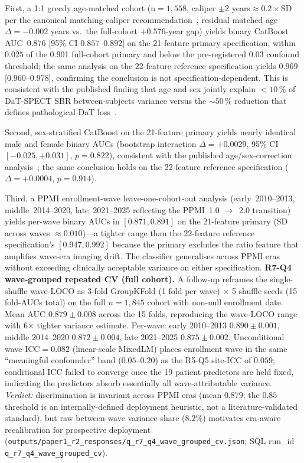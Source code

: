 \documentclass[10pt,letterpaper]{article}
\begin{document}
First, a 1:1 greedy age-matched cohort (n${=}1{,}558$, caliper $\pm 2$ years${\approx}0.2{\times}\mathrm{SD}$ per the canonical matching-caliper recommendation~\cite{austin2011caliper}, residual matched age~$\Delta{=}{-}0.002$ years vs.\ the full-cohort $+0.576$-year gap) yields binary CatBoost AUC~$0.876$ [95\% CI $0.857$--$0.892$] on the 21-feature primary specification, within $0.025$ of the 0.901 full-cohort primary and below the pre-registered $0.03$ confound threshold; the same analysis on the 22-feature reference specification yields $0.969$ [$0.960$--$0.978$], confirming the conclusion is not specification-dependent. This is consistent with the published finding that age and sex jointly explain $<\!10\,\%$ of DaT-SPECT SBR between-subjects variance versus the ${\sim}50\,\%$ reduction that defines pathological DaT loss~\cite{schmitzSteinkruger2021age,eusebi2017dat,varrone2013ageadjusted}.

Second, sex-stratified CatBoost on the 21-feature primary yields nearly identical male and female binary AUCs (bootstrap interaction $\Delta{=}{+}0.0029$, 95\% CI~$[-0.025, +0.031]$, $p{=}0.822$), consistent with the published age/sex-correction analysis~\cite{schmitzSteinkruger2021age}; the same conclusion holds on the 22-feature reference specification ($\Delta{=}{+}0.0004$, $p{=}0.914$).

Third, a PPMI enrollment-wave leave-one-cohort-out analysis (early~2010--2013, middle~2014--2020, late~2021--2025 reflecting the PPMI~1.0 $\rightarrow$~2.0 transition) yields per-wave binary AUCs in $[0.871, 0.891]$ on the 21-feature primary (SD across waves $\approx 0.010$)---a tighter range than the 22-feature reference specification's $[0.947, 0.992]$ because the primary excludes the ratio feature that amplifies wave-era imaging drift. The classifier generalises across PPMI eras without exceeding clinically acceptable variance on either specification. \textbf{R7-Q4 wave-grouped repeated CV (full cohort).} A follow-up reframes the single-shuffle wave-LOCO as 3-fold GroupKFold (1 fold per wave) $\times$ 5 shuffle seeds (15 fold-AUCs total) on the full $n{=}1{,}845$ cohort with non-null enrollment date. Mean AUC $0.879 \pm 0.008$ across the 15 folds, reproducing the wave-LOCO range with 6$\times$ tighter variance estimate. Per-wave: early 2010--2013 $0.890 \pm 0.001$, middle 2014--2020 $0.872 \pm 0.004$, late 2021--2025 $0.875 \pm 0.002$. Unconditional wave-ICC$=0.082$ (linear-scale MixedLM) places enrollment wave in the same ``meaningful confounder'' band ($0.05$--$0.20$) as the R5-Q5 site-ICC of $0.059$; conditional ICC failed to converge once the 19 patient predictors are held fixed, indicating the predictors absorb essentially all wave-attributable variance. \emph{Verdict:} discrimination is invariant across PPMI eras (mean $0.879$; the $0.85$ threshold is an internally-defined deployment heuristic, not a literature-validated standard), but raw between-wave variance share ($8.2\%$) motivates era-aware recalibration for prospective deployment (\texttt{outputs/paper1\_r2\_responses/q\_r7\_q4\_wave\_grouped\_cv.json}; SQL run\_id \texttt{q\_r7\_q4\_wave\_grouped\_cv}).
\end{document}
